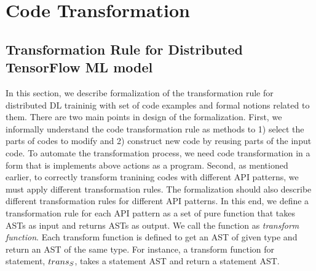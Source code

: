 \section{Code Transformation}\label{sec:trans}
\subsection{Transformation Rule for Distributed TensorFlow ML model}

In this section, we describe formalization of the transformation rule
for distributed DL traininig with set of code examples and formal notions
related to them.
There are two main points in design of the formalization.
First, we informally understand the code transformation rule as methods to
1) select the parts of codes to modify and 2) construct new code by reusing
parts of the input code.
To automate the transformation process, we need code transformation in a form 
that is implements above actions as a program.
Second, as mentioned earlier, to correctly transform tranining codes with different
API patterns, we must apply different transformation rules.
The formalization should also describe different transformation rules
for different API patterns.
In this end, we define a transformation rule for each API pattern as 
a set of pure function that takes ASTs as input and returns ASTs as output.
We call the function as \textit{transform function}.
Each transform function is defined to get an AST of given type and return an AST
of the same type. For instance, a transform function for statement,
$trans_S$, takes a statement AST and return a statement AST.

